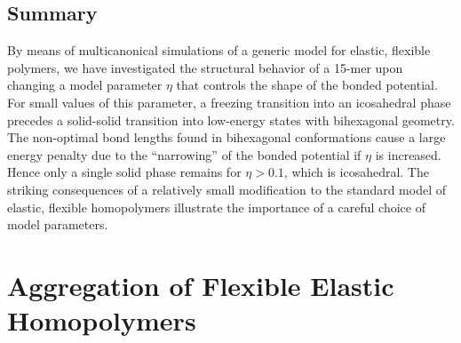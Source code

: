 \documentclass[12pt]{report}
\begin{document}
\section{Summary}
%
By means of multicanonical simulations of a generic model for elastic,
flexible polymers, we have investigated the structural behavior of a 15-mer
upon changing a model parameter $\eta$
that controls the shape of the bonded potential. For small values of
this parameter, a freezing transition into an icosahedral phase precedes a
solid-solid transition into low-energy states with
bihexagonal geometry. The non-optimal bond lengths found in bihexagonal
conformations cause a large energy penalty due to the ``narrowing'' of the
bonded potential if $\eta$ is increased. Hence only a single
solid phase remains for $\eta > 0.1$, which is icosahedral. The striking
consequences of a relatively small modification to the standard model of
elastic, flexible homopolymers illustrate the importance of a careful
choice of model parameters.




\chapter{Aggregation of Flexible Elastic Homopolymers}
\label{chap:Aggregation}
\end{document}
